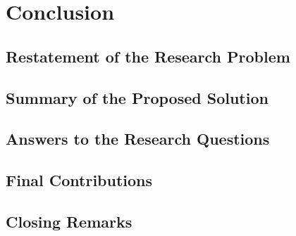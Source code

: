 \chapter{Conclusion}
\section{Restatement of the Research Problem}
\section{Summary of the Proposed Solution}
\section{Answers to the Research Questions}
\section{Final Contributions}
\section{Closing Remarks}

